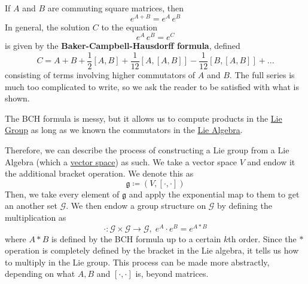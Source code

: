 \documentclass{article}
\newcounter{theorem}[section]
\begin{document}
    \begin{theorem}
      \label{thm:exponential-of-commuting-matrices}
      If $A$ and $B$ are commuting square matrices, then 
      \begin{equation}
        e^{A + B} = e^A \, e^B
      \end{equation}
      In general, the solution $C$ to the equation
      \begin{equation}
        e^{A} \, e^B = e^C
      \end{equation}
      is given by the \textbf{Baker-Campbell-Hausdorff formula}, defined
      \begin{equation}
        C = A + B + \frac{1}{2}[A,B] + \frac{1}{12} [A,[A,B]] - \frac{1}{12} [B,[A,B]] + ...
      \end{equation}
      consisting of terms involving higher commutators of $A$ and $B$. The full series is much too complicated to write, so we ask the reader to be satisfied with what is shown. 
    \end{theorem}

    The BCH formula is messy, but it allows us to compute products in the \hyperref[def:lie-group]{Lie Group} as long as we known the commutators in the \hyperref[def:lie-algebra]{Lie Algebra}. 

    Therefore, we can describe the process of constructing a Lie group from a Lie Algebra (which a \hyperref[lin-def:vector-space]{vector space}) as such. We take a vector space $V$ and endow it the additional bracket operation. We denote this as
    \begin{equation}
      \mathfrak{g} \coloneqq (V, [\cdot, \cdot])
    \end{equation}
    Then, we take every element of $\mathfrak{g}$ and apply the exponential map to them to get an another set $\mathcal{G}$. We then endow a group structure on $\mathcal{G}$ by defining the multiplication as 
    \begin{equation}
      \cdot: \mathcal{G} \times \mathcal{G} \rightarrow \mathcal{G}, \; e^A \cdot e^B = e^{A * B}
    \end{equation}
    where $A*B$ is defined by the BCH formula up to a certain $k$th order. Since the $*$ operation is completely defined by the bracket in the Lie algebra, it tells us how to multiply in the Lie group. This process can be made more abstractly, depending on what $A, B$ and $[\cdot,\cdot]$ is, beyond matrices. 
\end{document}
